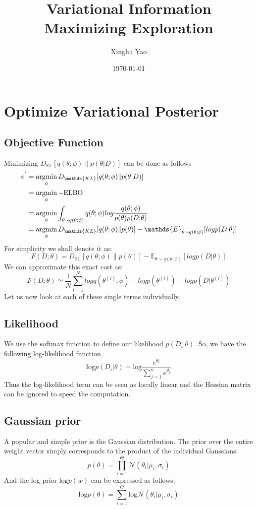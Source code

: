 \documentclass{article}
\title{Variational Information Maximizing Exploration}
\author{Xinghu Yao}
\date{\today}
\begin{document}
	\maketitle
	\section{Optimize Variational Posterior}
	\subsection{Objective Function}
	\noindent Minimizing $D_{\mathds{KL}}[q(\theta;\phi)\|p(\theta|D)]$ can be done as follows
	\begin{align}
	\phi^{'} &= \mathop{\text{argmin}}\limits_{\phi}D_{\mathds{KL}}[q(\theta;\phi)\|p(\theta|D)]\notag\\
	&= \mathop{\text{argmin}}\limits_{\phi} -\text{ELBO}\notag\\
	&= \mathop{\text{argmin}}\limits_{\phi}\int_{\theta \sim q(\theta;\phi)}q(\theta;\phi)log\frac{q(\theta;\phi)}{p(\theta)p(D|\theta)}\notag\\
	&= \mathop{\text{argmin}}\limits_{\phi}D_{\mathds{KL}}[q(\theta;\phi)\|p(\theta)]-\mathds{E}_{\theta\sim q(\theta;\phi)}[log p(D|\theta)]
	\end{align}
	For simplicity we shall denote it as:
	\begin{equation}
	F(D;\theta) = D_\mathds{KL}[q(\theta;\phi)\|p(\theta)]  -\mathds{E}_{\theta\sim q(\theta;\phi)}[log p(D|\theta)]
	\end{equation}
	We can approximate this exact cost as:
	\begin{equation}
	F(D;\theta) \simeq \frac{1}{N}\sum_{i=1}^{N}log q(\theta^{(i)};\phi)-log p(\theta^{(i)}) - log p(D|\theta^{(i)})
	\end{equation}
	Let us now look at each of these single terms individually.
	\subsection{Likelihood}
	\noindent We use the softmax function to define our likelihood $p(D_i|\theta)$. So, we have the following log-likelihood function
	\begin{equation}
	\text{log}p(D_i|\theta) = \text{log}\frac{e^{\theta_i}}{\sum_{j=1}^ne^{\theta_j}}
	\end{equation}
	Thus the log-likelihood term can be seen as locally linear and the Hessian matrix can be ignored to speed the computation.
	\subsection{Gaussian prior}
	\noindent A popular and simple prior is the Gaussian distribution. The prior over the entire weight vector simply corresponds to the product of the individual Gaussians:
	\begin{equation}
	p(\theta) = \prod_{i=1}^{\Theta}\mathcal{N}(\theta_i|\mu_i,\sigma_i)
	\end{equation}
	And the log-prior $\text{log}p(w)$ can be expressed as follows:
	\begin{equation}
	\text{log}p(\theta) = \sum_{i=1}^{\Theta}\text{log}\mathcal{N}(\theta_i|\mu_i,\sigma_i)
	\end{equation}   
\end{document}
